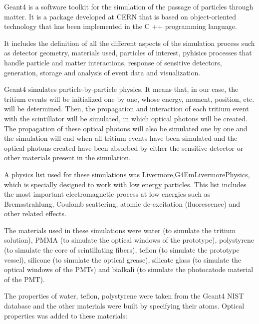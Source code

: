 Geant4 is a software toolkit for the simulation of the passage of particles through matter. It is a package developed at CERN that is based on object-oriented technology that has been implemented in the C ++ programming language.

It includes the definition of all the different aspects of the simulation process such as detector geometry, materials used, particles of interest, pyhisics processes that handle particle and matter interactions, response of sensitive detectors, generation, storage and analysis of event data and visualization.

Geant4 simulates particle-by-particle physics. It means that, in our case, the tritium events will be initialized one by one, whose energy, moment, position, etc. will be determined. Then, the propagation and interaction of each tritium event with the scintillator will be simulated, in which optical photons will be created. The propagation of these optical photons will also be simulated one by one and the simulation will end when all tritium events have been simulated and the optical photons created have been absorbed by either the sensitive detector or other materials present in the simulation.

A physics list used for these simulations was Livermore,\newline G4EmLivermorePhysics, which is specially designed to work with low energy particles. This list includes the most important electromagnetic process at low energies such as Bremsstrahlung, Coulomb scattering, atomic de-excitation (fluorescence) and other related effects.

The materials used in these simulations were water (to simulate the tritium solution), PMMA (to simulate the optical windows of the prototype), polystyrene (to simulate the core of scintillating fibers), teflon (to simulate the prototype vessel), silicone (to simulate the optical grease), silicate glass (to simulate the optical windows of the PMTs) and bialkali (to simulate the photocatode material of the PMT).

The properties of water, teflon, polystyrene were taken from the Geant4 NIST database and the other materials were built by specifying their atoms. Optical properties was added to these materials:

